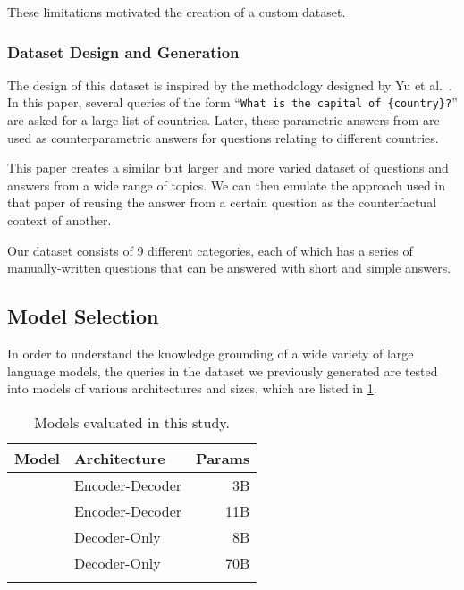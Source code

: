 These limitations motivated the creation of a custom dataset.

\subsubsection{Dataset Design and Generation}

The design of this dataset is inspired by the methodology designed by Yu et al.\ \cite{factual_recall}.
In this paper, several queries of the form ``\texttt{What is the capital of \{country\}?}'' are asked for a large list of countries.
Later, these parametric answers from are used as counterparametric answers for questions relating to different countries.

This paper creates a similar but larger and more varied dataset of questions and answers from a wide range of topics.
We can then emulate the approach used in that paper of reusing the answer from a certain question as the counterfactual context of another.

Our dataset consists of 9 different categories, each of which has a series of manually-written questions that can be answered with short and simple answers.

\subsection{Model Selection}
\label{model_selection}

In order to understand the knowledge grounding of a wide variety of large language
models, the queries in the dataset we previously generated are tested into models of various architectures and sizes, which are listed in \cref{model_list}.

\begin{table}[htb]
	\centering
	\footnotesize
	\begin{tabular}{l l r}
		\toprule
			Model             & Architecture    & Params \\
		\midrule
			\smallflan{}      & Encoder-Decoder & 3B          \\
			\bigflan{}        & Encoder-Decoder & 11B         \\
			\smallllama{}    & Decoder-Only    & 8B          \\
			\bigllama{} & Decoder-Only    & 70B         \\
		\bottomrule \addlinespace[4pt]
	\end{tabular}
	\caption{Models evaluated in this study.}
	\label{model_list}
\end{table}

